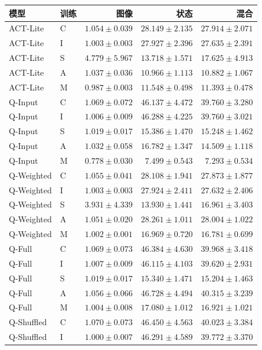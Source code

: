 \documentclass[11pt,a4paper,fontset=fandol]{ctexart}
\begin{document}
\begin{center}
\footnotesize
\begin{tabular}{llrrr}
\toprule
模型 & 训练 & 图像 & 状态 & 混合 \\
\midrule
ACT-Lite & C & $1.054\pm0.039$ & $28.149\pm2.135$ & $27.914\pm2.071$ \\
ACT-Lite & I & $1.003\pm0.003$ & $27.927\pm2.396$ & $27.635\pm2.391$ \\
ACT-Lite & S & $4.779\pm5.967$ & $13.718\pm1.571$ & $17.625\pm4.913$ \\
ACT-Lite & A & $1.037\pm0.036$ & $10.966\pm1.113$ & $10.882\pm1.067$ \\
ACT-Lite & M & $0.987\pm0.003$ & $11.548\pm0.498$ & $11.393\pm0.478$ \\
Q-Input & C & $1.069\pm0.072$ & $46.137\pm4.472$ & $39.760\pm3.280$ \\
Q-Input & I & $1.006\pm0.009$ & $46.288\pm4.225$ & $39.760\pm3.021$ \\
Q-Input & S & $1.019\pm0.017$ & $15.386\pm1.470$ & $15.248\pm1.462$ \\
Q-Input & A & $1.032\pm0.058$ & $16.782\pm1.347$ & $14.509\pm1.118$ \\
Q-Input & M & $0.778\pm0.030$ & $7.499\pm0.543$ & $7.293\pm0.534$ \\
Q-Weighted & C & $1.055\pm0.041$ & $28.108\pm1.941$ & $27.873\pm1.877$ \\
Q-Weighted & I & $1.003\pm0.003$ & $27.924\pm2.411$ & $27.632\pm2.406$ \\
Q-Weighted & S & $3.931\pm4.339$ & $13.930\pm1.441$ & $16.961\pm3.403$ \\
Q-Weighted & A & $1.051\pm0.020$ & $28.261\pm1.011$ & $28.004\pm1.022$ \\
Q-Weighted & M & $1.002\pm0.001$ & $16.969\pm0.720$ & $16.781\pm0.699$ \\
Q-Full & C & $1.069\pm0.073$ & $46.384\pm4.630$ & $39.968\pm3.418$ \\
Q-Full & I & $1.007\pm0.009$ & $46.115\pm4.103$ & $39.620\pm2.931$ \\
Q-Full & S & $1.019\pm0.017$ & $15.340\pm1.471$ & $15.204\pm1.463$ \\
Q-Full & A & $1.056\pm0.066$ & $46.728\pm4.494$ & $40.315\pm3.239$ \\
Q-Full & M & $1.004\pm0.008$ & $17.080\pm1.012$ & $16.921\pm1.021$ \\
Q-Shuffled & C & $1.070\pm0.073$ & $46.450\pm4.563$ & $40.023\pm3.384$ \\
Q-Shuffled & I & $1.000\pm0.007$ & $46.291\pm4.589$ & $39.772\pm3.370$ \\

\end{tabular}
\end{center}
\end{document}
